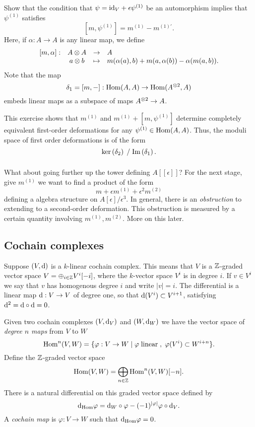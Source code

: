 \documentclass[11pt]{amsart}
\begin{document}
\begin{ex}
Show that the condition that $\psi = {\rm id}_V + \epsilon \psi^{(1)}$ be an automorphism implies that $\psi^{(1)}$ satisfies
\[
[m, \psi^{(1)}] = m^{(1)} - m^{(1)'} .
\] 
Here, if $\alpha : A \to A$ is any linear map, we define 
\[
\begin{array}{cccl}
[m, \alpha] : & A \otimes A & \to & A \\
&  a \otimes b & \mapsto & m (\alpha(a), b) + m (a, \alpha(b)) - \alpha (m(a,b)) .
\end{array}
\]
Note that the map
\[
\delta_1 = [m, -] : {\rm Hom}(A,A) \to {\rm Hom}(A^{\otimes 2}, A)
\]
embeds linear maps as a subspace of maps $A^{\otimes 2} \to A$. 
\end{ex}
This exercise shows that $m^{(1)}$ and $m^{(1)} + [m, \psi^{(1)}]$ determine completely equivalent first-order deformations for any $\psi^{(1)} \in {\rm Hom}(A,A)$. 
Thus, the moduli space of first order deformations is of the form  
\[
\ker\left(\delta_2\right) \; / \; {\rm Im} \left(\delta_1\right) .
\]

\subsubsection{}

What about going further up the tower defining $A[[\epsilon]]$? 
For the next stage, give $m^{(1)}$ we want to find a product of the form
\[
m + \epsilon m^{(1)} + \epsilon^2 m^{(2)}
\]
defining a algebra structure on $A[\epsilon]/\epsilon^3$. 
In general, there is an {\em obstruction} to extending to a second-order deformation. 
This obstruction is measured by a certain quantity involving $m^{(1)}, m^{(2)}$.
More on this later.  

\subsection{Cochain complexes}

Suppose $(V, {\rm d})$ is a $k$-linear cochain complex. 
This means that $V$ is a $\mathbb Z$-graded vector space $V = \oplus_{i \in \mathbb Z} V^i [-i]$, where the $k$-vector space $V^i$ is in degree $i$.
If $v \in V^i$ we say that $v$ has homogenous degree $i$ and write $|v| = i$. 
The differential is a linear map ${\rm d} : V \to V$ of degree one, so that ${\rm d} (V^i) \subset V^{i+1}$, satisfying ${\rm d}^2 = {\rm d} \circ {\rm d} = 0$. 

Given two cochain complexes $(V, {\rm d}_V)$ and $(W, {\rm d}_W)$ we have the vector space of {\em degree $n$ maps} from $V$ to $W$
\[
{\rm Hom}^n (V,W) = \{\varphi : V \to W \; | \; \varphi \; {\rm linear} \; , \; \varphi(V^i) \subset W^{i+n} \} .
\]
Define the $\mathbb Z$-graded vector space
\[
{\rm Hom}(V,W) = \bigoplus_{n \in \mathbb Z} {\rm Hom}^n(V,W)[-n] .
\] 
There is a natural differential on this graded vector space defined by
\[
{\rm d}_{\rm Hom} \varphi = {\rm d}_W \circ \varphi -  (-1)^{|\varphi|} \varphi \circ {\rm d}_V .
\]
A {\em cochain map} is $\varphi : V \to W$ such that ${\rm d}_{\rm Hom} \varphi = 0$. 
\end{document}
